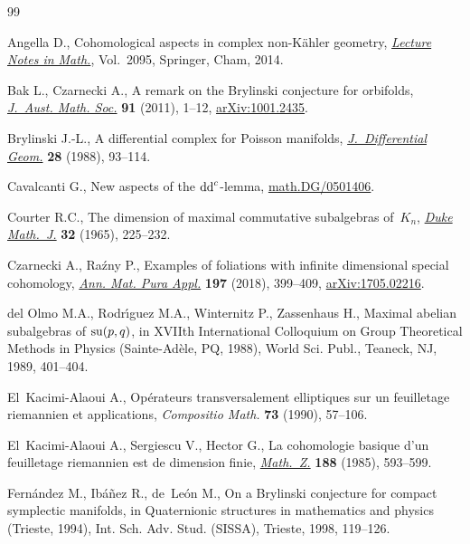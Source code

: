 \documentclass[pdftex]{sigma}
\numberwithin{equation}{section}
\begin{document}
\begin{thebibliography}{99}
\footnotesize\itemsep=0pt

Angella D., Cohomological aspects in complex non-{K}\"ahler geometry,
 \href{https://doi.org/10.1007/978-3-319-02441-7}{\textit{Lecture Notes in Math.}}, Vol.~2095, Springer, Cham, 2014.

Bak L., Czarnecki A., A remark on the {B}rylinski conjecture for orbifolds,
 \href{https://doi.org/10.1017/S1446788711001455}{\textit{J.~Aust. Math. Soc.}} \textbf{91} (2011), 1--12, \href{https://arxiv.org/abs/1001.2435}{arXiv:1001.2435}.

Brylinski J.-L., A differential complex for {P}oisson manifolds,
 \href{https://doi.org/10.4310/jdg/1214442161}{\textit{J.~Differential Geom.}} \textbf{28} (1988), 93--114.

Cavalcanti G., New aspects of the ${\rm dd}^c$-lemma, \href{https://arxiv.org/abs/math.DG/0501406}{math.DG/0501406}.

Courter R.C., The dimension of maximal commutative subalgebras of~{$K_{n}$},
 \href{https://doi.org/10.1215/S0012-7094-65-03219-9}{\textit{Duke Math.~J.}} \textbf{32} (1965), 225--232.

Czarnecki A., Ra\'zny P., Examples of foliations with infinite dimensional
 special cohomology, \href{https://doi.org/10.1007/s10231-017-0684-x}{\textit{Ann. Mat. Pura Appl.}} \textbf{197} (2018),
 399--409, \href{https://arxiv.org/abs/1705.02216}{arXiv:1705.02216}.

del Olmo M.A., Rodr\'{\i}guez M.A., Winternitz P., Zassenhaus H., Maximal
 abelian subalgebras of {${\rm su}(p,q)$}, in X{VII}th {I}nternational
 {C}olloquium on {G}roup {T}heoretical {M}ethods in {P}hysics
 ({S}ainte-{A}d\`ele, {PQ}, 1988), World Sci. Publ., Teaneck, NJ, 1989,
 401--404.

El~Kacimi-Alaoui A., Op\'erateurs transversalement elliptiques sur un
 feuilletage riemannien et applications, \textit{Compositio Math.} \textbf{73}
 (1990), 57--106.

El~Kacimi-Alaoui A., Sergiescu V., Hector G., La cohomologie basique d'un
 feuilletage riemannien est de dimension finie, \href{https://doi.org/10.1007/BF01161658}{\textit{Math.~Z.}} \textbf{188}
 (1985), 593--599.

Fern\'andez M., Ib\'a\~nez R., de~Le\'on M., On a {B}rylinski conjecture for
 compact symplectic manifolds, in Quaternionic structures in mathematics and
 physics ({T}rieste, 1994), Int. Sch. Adv. Stud. (SISSA), Trieste, 1998,
 119--126.


\end{thebibliography}
\end{document}
